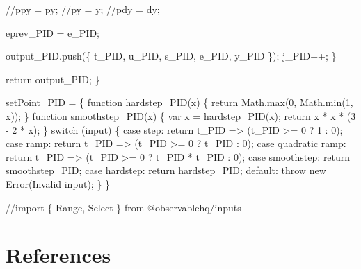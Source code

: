 \documentclass[
  letterpaper,
  DIV=11]{scrreprt}
\newenvironment{Shaded}{\begin{snugshade}}{\end{snugshade}}
\newcommand{\NormalTok}[1]{\textcolor[rgb]{0.00,0.23,0.31}{#1}}
\newlength{\cslhangindent}
\newenvironment{CSLReferences}[2] %
 {\begin{list}{}{%
  \setlength{\itemindent}{0pt}
  \setlength{\leftmargin}{0pt}
  \setlength{\parsep}{0pt}
  \ifodd #1
   \setlength{\leftmargin}{\cslhangindent}
   \setlength{\itemindent}{-1\cslhangindent}
  \fi
  \setlength{\itemsep}{#2\baselineskip}}}
 {\end{list}}
\begin{document}
\begin{Shaded}
\begin{Highlighting}[]
\NormalTok{    //ppy = py;}
\NormalTok{    //py = y;}
\NormalTok{    //pdy = dy;}

\NormalTok{    eprev\_PID = e\_PID;}

\NormalTok{    output\_PID.push(\{ t\_PID, u\_PID, s\_PID, e\_PID, y\_PID \});}
\NormalTok{    j\_PID++;}
\NormalTok{  \}}

\NormalTok{  return output\_PID;}
\NormalTok{\}}

\NormalTok{setPoint\_PID = \{}
\NormalTok{  function hardstep\_PID(x) \{}
\NormalTok{    return Math.max(0, Math.min(1, x));}
\NormalTok{  \}}
\NormalTok{  function smoothstep\_PID(x) \{}
\NormalTok{    var x = hardstep\_PID(x);}
\NormalTok{    return x * x * (3 {-} 2 * x);}
\NormalTok{  \}}
\NormalTok{  switch (input) \{}
\NormalTok{    case \textquotesingle{}step\textquotesingle{}:}
\NormalTok{      return t\_PID =\textgreater{} (t\_PID \textgreater{}= 0 ? 1 : 0);}
\NormalTok{    case \textquotesingle{}ramp\textquotesingle{}:}
\NormalTok{      return t\_PID =\textgreater{} (t\_PID \textgreater{}= 0 ? t\_PID : 0);}
\NormalTok{    case \textquotesingle{}quadratic ramp\textquotesingle{}:}
\NormalTok{      return t\_PID =\textgreater{} (t\_PID \textgreater{}= 0 ? t\_PID * t\_PID : 0);}
\NormalTok{    case \textquotesingle{}smoothstep\textquotesingle{}:}
\NormalTok{      return smoothstep\_PID;}
\NormalTok{    case \textquotesingle{}hardstep\textquotesingle{}:}
\NormalTok{      return hardstep\_PID;}
\NormalTok{    default:}
\NormalTok{      throw new Error(\textquotesingle{}Invalid input\textquotesingle{});}
\NormalTok{  \}}
\NormalTok{\}}

\NormalTok{//import \{ Range, Select \} from \textquotesingle{}@observablehq/inputs\textquotesingle{}}
\end{Highlighting}
\end{Shaded}


\chapter*{References}\label{references}


\label{refs}
\begin{CSLReferences}{0}{1}
\end{CSLReferences}
\end{document}

